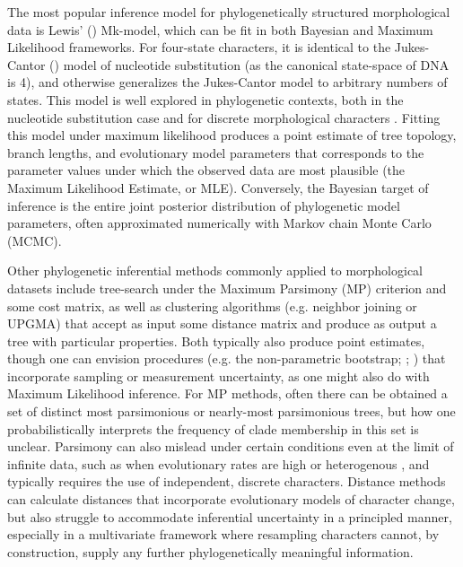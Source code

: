 The most popular inference model for phylogenetically structured morphological data is Lewis’ (\citeyear{lewisLikelihoodApproachEstimating2001}) Mk-model, which can be fit in both Bayesian and Maximum Likelihood frameworks. For four-state characters, it is identical to the Jukes-Cantor (\citeyear{jukesEvolutionProteinMolecules1969}) model of nucleotide substitution (as the canonical state-space of DNA is 4), and otherwise generalizes the Jukes-Cantor model to arbitrary numbers of states. This model is well explored in phylogenetic contexts, both in the nucleotide substitution case and for discrete morphological characters \citep[e.g.][]{wrightModelingCharacterChange2016}. Fitting this model under maximum likelihood produces a point estimate of tree topology, branch lengths, and evolutionary model parameters that corresponds to the parameter values under which the observed data are most plausible (the Maximum Likelihood Estimate, or MLE). Conversely, the Bayesian target of inference is the entire joint posterior distribution of phylogenetic model parameters, often approximated numerically with Markov chain Monte Carlo (MCMC).

Other phylogenetic inferential methods commonly applied to morphological datasets include tree-search under the Maximum Parsimony (MP) criterion and some cost matrix, as well as clustering algorithms (e.g. neighbor joining or UPGMA) that accept as input some distance matrix and produce as output a tree with particular properties. Both typically also produce point estimates, though one can envision procedures (e.g. the non-parametric bootstrap; \citealt{efronBootstrapMethodsAnother1979}; \citealt{felsensteinConfidenceLimitsPhylogenies1985}) that incorporate sampling or measurement uncertainty, as one might also do with Maximum Likelihood inference. For MP methods, often there can be obtained a set of distinct most parsimonious or nearly-most parsimonious trees, but how one probabilistically interprets the frequency of clade membership in this set is unclear. Parsimony can also mislead under certain conditions even at the limit of infinite data, such as when evolutionary rates are high or heterogenous \citep{wrightBayesianAnalysisUsing2014, wrightModelingCharacterChange2016, oreillyProbabilisticMethodsSurpass2018}, and typically requires the use of independent, discrete characters. Distance methods can calculate distances that incorporate evolutionary models of character change, but also struggle to accommodate inferential uncertainty in a principled manner, especially in a multivariate framework where resampling characters cannot, by construction, supply any further phylogenetically meaningful information. 

